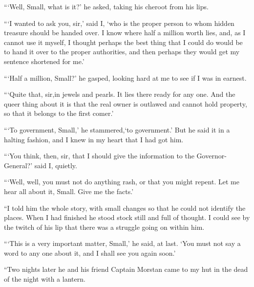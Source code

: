 \documentclass[12pt,english,oneside]{book}
\begin{document}
{}```Well, Small, what is it?' he asked, taking his cheroot from
his lips.

{}```I wanted to ask you, sir,' said I, `who is the proper person
to whom hidden treasure should be handed over. I know where half a
million worth lies, and, as I cannot use it myself, I thought perhaps
the best thing that I could do would be to hand it over to the proper
authorities, and then perhaps they would get my sentence shortened
for me.'

{}```Half a million, Small?' he gasped, looking hard at me to see
if I was in earnest.

{}```Quite that, sir,\mdsh{---}in jewels and pearls. It lies there
ready for any one. And the queer thing about it is that the real owner
is outlawed and cannot hold property, so that it belongs to the first
comer.'

{}```To government, Small,' he stam\-mer\-ed,\mdsh{---}`to government.'
But he said it in a halting fashion, and I knew in my heart that I
had got him.

{}```You think, then, sir, that I should give the information to
the Governor-General?' said I, quietly.

{}```Well, well, you must not do anything rash, or that you might
repent. Let me hear all about it, Small. Give me the facts.'

{}``I told him the whole story, with small changes so that he could
not identify the places. When I had finished he stood stock still
and full of thought. I could see by the twitch of his lip that there
was a struggle going on within him.

{}```This is a very important matter, Small,' he said, at last. `You
must not say a word to any one about it, and I shall see you again
soon.'

{}``Two nights later he and his friend Captain Morstan came to my
hut in the dead of the night with a lantern.
\end{document}
